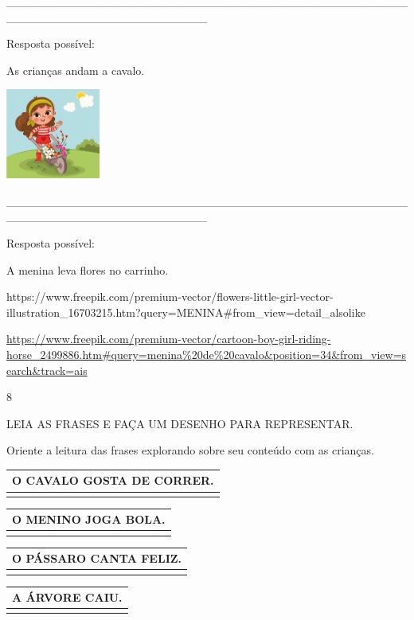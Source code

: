 {{\_\_\_\_\_\_\_\_\_\_\_\_\_\_\_\_\_\_\_\_\_\_\_\_\_\_\_\_\_\_\_\_\_\_\_\_\_\_\_\_\_\_\_\_\_\_\_\_\_\_\_\_\_\_\_\_\_\_\_\_\_\_\_\_\_\_\_\_\_\_\_\_

Resposta possível:

As crianças andam a cavalo.

\includegraphics[width=1.21656in,height=1.16552in]{media/image68.jpeg}

\_\_\_\_\_\_\_\_\_\_\_\_\_\_\_\_\_\_\_\_\_\_\_\_\_\_\_\_\_\_\_\_\_\_\_\_\_\_\_\_\_\_\_\_\_\_\_\_\_\_\_\_\_\_\_\_\_\_\_\_\_\_\_\_\_\_\_\_\_\_\_\_

Resposta possível:

A menina leva flores no carrinho.

https://www.freepik.com/premium-vector/flowers-little-girl-vector-illustration\_16703215.htm?query=MENINA\#from\_view=detail\_alsolike

\url{https://www.freepik.com/premium-vector/cartoon-boy-girl-riding-horse_2499886.htm\#query=menina\%20de\%20cavalo\&position=34\&from_view=search\&track=ais}

\num{8}

LEIA AS FRASES E FAÇA UM DESENHO PARA REPRESENTAR.

Oriente a leitura das frases explorando sobre seu conteúdo com as
crianças.

\begin{longtable}[]{@{}l@{}}
\toprule
O CAVALO GOSTA DE CORRER.\tabularnewline
\midrule
\endhead
\tabularnewline
\bottomrule
\end{longtable}

\begin{longtable}[]{@{}l@{}}
\toprule
O MENINO JOGA BOLA.\tabularnewline
\midrule
\endhead
\tabularnewline
\bottomrule
\end{longtable}

\begin{longtable}[]{@{}l@{}}
\toprule
O PÁSSARO CANTA FELIZ.\tabularnewline
\midrule
\endhead
\tabularnewline
\bottomrule
\end{longtable}

\begin{longtable}[]{@{}l@{}}
\toprule
A ÁRVORE CAIU.\tabularnewline
\midrule
\endhead
\tabularnewline
\bottomrule
\end{longtable}

}}
